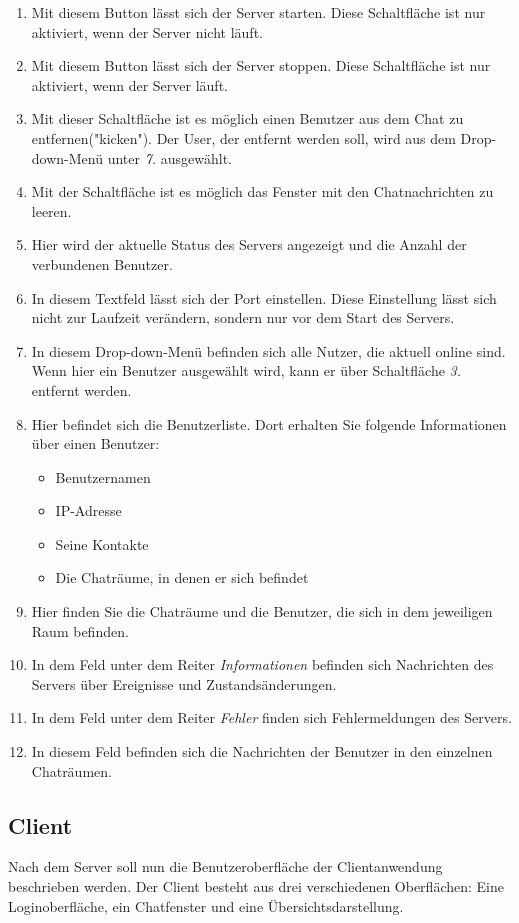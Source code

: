 \documentclass[12pt,a4paper,bibliography=totocnumbered,listof=totocnumbered]{scrartcl}
\begin{document}
\begin{enumerate}
	\item Mit diesem Button lässt sich der Server starten. Diese Schaltfläche ist nur aktiviert, wenn der Server nicht läuft.
	\item Mit diesem Button lässt sich der Server stoppen. Diese Schaltfläche ist nur aktiviert, wenn der Server läuft.
	\item Mit dieser Schaltfläche ist es möglich einen Benutzer aus dem Chat zu entfernen("kicken"). Der User, der entfernt werden soll, wird aus dem Drop-down-Menü unter \textit{7.} ausgewählt.
	\item Mit der Schaltfläche ist es möglich das Fenster mit den Chatnachrichten zu leeren.
	\item Hier wird der aktuelle Status des Servers angezeigt und die Anzahl der verbundenen Benutzer.
	\item In diesem Textfeld lässt sich der Port einstellen. Diese Einstellung lässt sich nicht zur Laufzeit verändern, sondern nur vor dem Start des Servers.
	\item In diesem Drop-down-Menü befinden sich alle Nutzer, die aktuell online sind. Wenn hier ein Benutzer ausgewählt wird, kann er über Schaltfläche \textit{3.} entfernt werden.
	\item Hier befindet sich die Benutzerliste. Dort erhalten Sie folgende Informationen über einen Benutzer:
		\begin{itemize}
			\item Benutzernamen
			\item IP-Adresse
			\item Seine Kontakte
			\item Die Chaträume, in denen er sich befindet
		\end{itemize}
	
	\item Hier finden Sie die Chaträume und die Benutzer, die sich in dem jeweiligen Raum befinden.
	\item In dem Feld unter dem Reiter \textit{Informationen} befinden sich Nachrichten des Servers über Ereignisse und Zustandsänderungen.
	\item In dem Feld unter dem Reiter \textit{Fehler} finden sich Fehlermeldungen des Servers.
	\item In diesem Feld befinden sich die Nachrichten der Benutzer in den einzelnen Chaträumen.
\end{enumerate}
\newpage
\subsection{Client}
Nach dem Server soll nun die Benutzeroberfläche der Clientanwendung beschrieben werden. Der Client besteht aus drei verschiedenen Oberflächen: Eine Loginoberfläche, ein Chatfenster und eine Übersichtsdarstellung.
\end{document}

